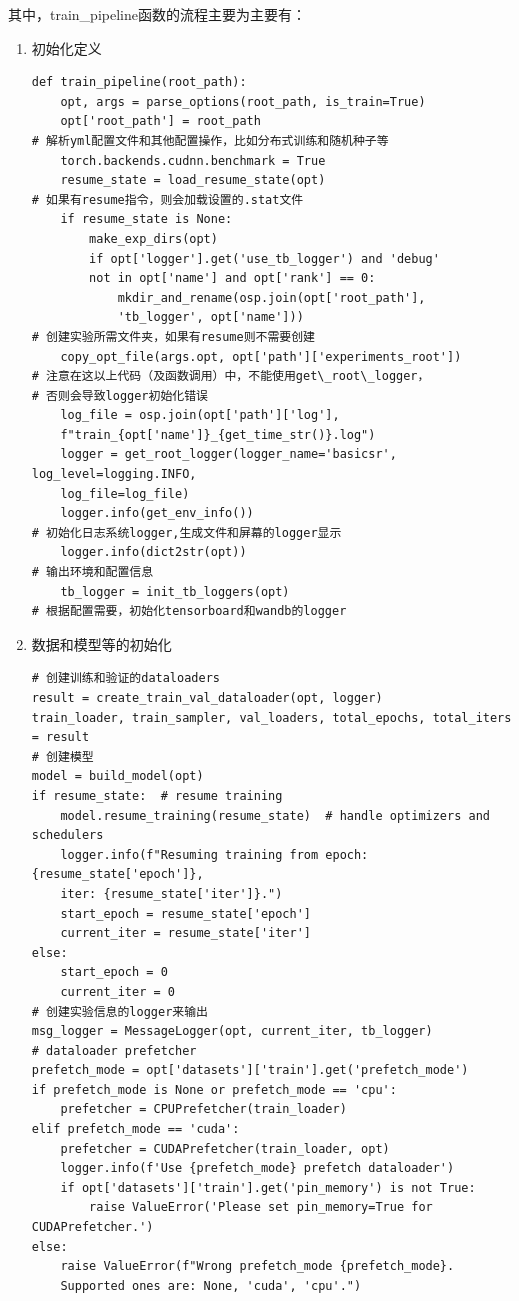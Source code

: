 \documentclass[../main.tex]{subfiles}
\begin{document}
\begin{enumerate}
其中，train\_pipeline函数的流程主要为主要有：
\begin{enumerate}

\item 初始化定义

\begin{verbatim}
def train_pipeline(root_path):
    opt, args = parse_options(root_path, is_train=True)
    opt['root_path'] = root_path
# 解析yml配置文件和其他配置操作，比如分布式训练和随机种子等
    torch.backends.cudnn.benchmark = True
    resume_state = load_resume_state(opt)
# 如果有resume指令，则会加载设置的.stat文件
    if resume_state is None:
        make_exp_dirs(opt)
        if opt['logger'].get('use_tb_logger') and 'debug' 
        not in opt['name'] and opt['rank'] == 0:
            mkdir_and_rename(osp.join(opt['root_path'],
            'tb_logger', opt['name']))
# 创建实验所需文件夹，如果有resume则不需要创建
    copy_opt_file(args.opt, opt['path']['experiments_root'])
# 注意在这以上代码（及函数调用）中，不能使用get\_root\_logger，
# 否则会导致logger初始化错误
    log_file = osp.join(opt['path']['log'],
    f"train_{opt['name']}_{get_time_str()}.log")
    logger = get_root_logger(logger_name='basicsr', log_level=logging.INFO,
    log_file=log_file)
    logger.info(get_env_info())
# 初始化日志系统logger,生成文件和屏幕的logger显示
    logger.info(dict2str(opt))
# 输出环境和配置信息
    tb_logger = init_tb_loggers(opt)
# 根据配置需要，初始化tensorboard和wandb的logger

\end{verbatim}

\item 数据和模型等的初始化

\begin{verbatim}
# 创建训练和验证的dataloaders
result = create_train_val_dataloader(opt, logger)
train_loader, train_sampler, val_loaders, total_epochs, total_iters = result
# 创建模型
model = build_model(opt)
if resume_state:  # resume training
    model.resume_training(resume_state)  # handle optimizers and schedulers
    logger.info(f"Resuming training from epoch: {resume_state['epoch']}, 
    iter: {resume_state['iter']}.")
    start_epoch = resume_state['epoch']
    current_iter = resume_state['iter']
else:
    start_epoch = 0
    current_iter = 0
# 创建实验信息的logger来输出
msg_logger = MessageLogger(opt, current_iter, tb_logger)
# dataloader prefetcher
prefetch_mode = opt['datasets']['train'].get('prefetch_mode')
if prefetch_mode is None or prefetch_mode == 'cpu':
    prefetcher = CPUPrefetcher(train_loader)
elif prefetch_mode == 'cuda':
    prefetcher = CUDAPrefetcher(train_loader, opt)
    logger.info(f'Use {prefetch_mode} prefetch dataloader')
    if opt['datasets']['train'].get('pin_memory') is not True:
        raise ValueError('Please set pin_memory=True for CUDAPrefetcher.')
else:
    raise ValueError(f"Wrong prefetch_mode {prefetch_mode}.
    Supported ones are: None, 'cuda', 'cpu'.")


\end{verbatim}
\end{enumerate}
\end{enumerate}
\end{document}
